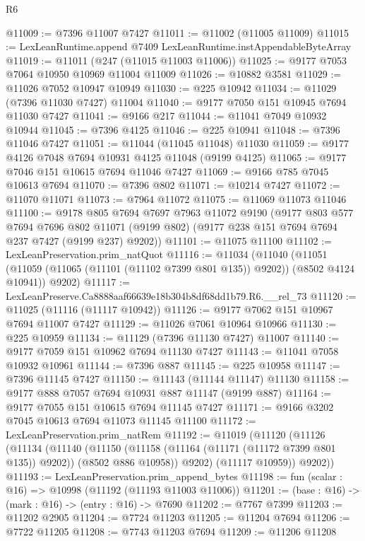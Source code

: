 \begin{lexlean}{R6}
\begin{coremodule}
@11009 := @7396 @11007 @7427
@11011 := @11002 (@11005 @11009)
@11015 := LexLeanRuntime.append @7409 LexLeanRuntime.instAppendableByteArray
@11019 := @11011 (@247 (@11015 @11003 @11006))
@11025 := @9177 @7053 @7064 @10950 @10969 @11004 @11009
@11026 := @10882 @3581
@11029 := @11026 @7052 @10947 @10949
@11030 := @225 @10942
@11034 := @11029 (@7396 @11030 @7427) @11004
@11040 := @9177 @7050 @151 @10945 @7694 @11030 @7427
@11041 := @9166 @217
@11044 := @11041 @7049 @10932 @10944
@11045 := @7396 @4125
@11046 := @225 @10941
@11048 := @7396 @11046 @7427
@11051 := @11044 (@11045 @11048) @11030
@11059 := @9177 @4126 @7048 @7694 @10931 @4125 @11048 (@9199 @4125)
@11065 := @9177 @7046 @151 @10615 @7694 @11046 @7427
@11069 := @9166 @785 @7045 @10613 @7694
@11070 := @7396 @802
@11071 := @10214 @7427
@11072 := @11070 @11071
@11073 := @7964 @11072
@11075 := @11069 @11073 @11046
@11100 := @9178
    @805
    @7694
    @7697
    @7963
    @11072
    @9190
    (@9177
      @803
      @577
      @7694
      @7696
      @802
      @11071
      (@9199 @802)
      (@9177 @238 @151 @7694 @7694 @237 @7427 (@9199 @237) @9202))
@11101 := @11075 @11100
@11102 := LexLeanPreservation.prim_natQuot
@11116 := @11034
    (@11040
      (@11051 (@11059 (@11065 (@11101 (@11102 @7399 @801 @135)) @9202)) (@8502 @4124 @10941))
      @9202)
@11117 := LexLeanPreserve.Ca8888aaf66639e18b304b8df68dd1b79.R6.__rel_73
@11120 := @11025 (@11116 (@11117 @10942))
@11126 := @9177 @7062 @151 @10967 @7694 @11007 @7427
@11129 := @11026 @7061 @10964 @10966
@11130 := @225 @10959
@11134 := @11129 (@7396 @11130 @7427) @11007
@11140 := @9177 @7059 @151 @10962 @7694 @11130 @7427
@11143 := @11041 @7058 @10932 @10961
@11144 := @7396 @887
@11145 := @225 @10958
@11147 := @7396 @11145 @7427
@11150 := @11143 (@11144 @11147) @11130
@11158 := @9177 @888 @7057 @7694 @10931 @887 @11147 (@9199 @887)
@11164 := @9177 @7055 @151 @10615 @7694 @11145 @7427
@11171 := @9166 @3202 @7045 @10613 @7694 @11073 @11145 @11100
@11172 := LexLeanPreservation.prim_natRem
@11192 := @11019
    (@11120
      (@11126
        (@11134
          (@11140
            (@11150 (@11158 (@11164 (@11171 (@11172 @7399 @801 @135)) @9202)) (@8502 @886 @10958))
            @9202)
          (@11117 @10959))
        @9202))
@11193 := LexLeanPreservation.prim_append_bytes
@11198 := fun (scalar : @16) => @10998 (@11192 (@11193 @11003 @11006))
@11201 := (base : @16) -> (mark : @16) -> (entry : @16) -> @7690
@11202 := @7767 @7399
@11203 := @11202 @2905
@11204 := @7724 @11203
@11205 := @11204 @7694
@11206 := @7722 @11205
@11208 := @7743 @11203 @7694
@11209 := @11206 @11208

\end{coremodule}
\end{lexlean}
